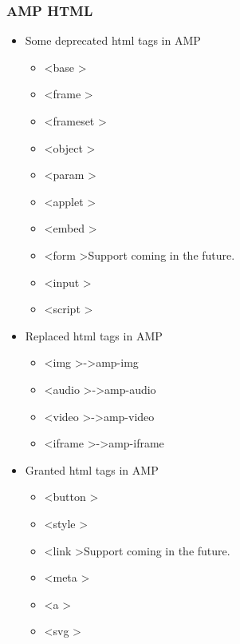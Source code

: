 \documentclass[a4paper]{article}
\begin{document}
\subsubsection{AMP HTML}
    \begin{itemize}
        \item Some deprecated html tags in AMP
        \begin{itemize}
            \item \textless base \textgreater
            \item \textless frame \textgreater
            \item \textless frameset \textgreater
            \item \textless object \textgreater
            \item \textless param \textgreater
            \item \textless applet \textgreater
            \item \textless embed \textgreater
            \item \textless form \textgreater Support coming in the future.
            \item \textless input \textgreater
            \item \textless script \textgreater
        \end{itemize}
        \item Replaced html tags in AMP
        \begin{itemize}
            \item \textless img \textgreater -\textgreater amp-img
            \item \textless audio \textgreater -\textgreater amp-audio
            \item \textless video \textgreater -\textgreater amp-video
            \item \textless iframe \textgreater -\textgreater amp-iframe
        \end{itemize}
        \item Granted html tags in AMP
        \begin{itemize}
            \item \textless button \textgreater
            \item \textless style \textgreater
            \item \textless link \textgreater Support coming in the future.
            \item \textless meta \textgreater
            \item \textless a \textgreater
            \item \textless svg \textgreater
        \end{itemize}
    \end{itemize}
\end{document}
